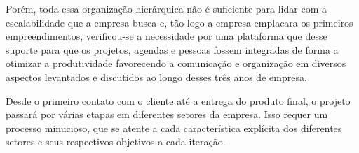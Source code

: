 Porém, toda essa organização hierárquica não é suficiente para lidar com a escalabilidade que a empresa busca e, tão logo a empresa emplacara os primeiros empreendimentos, verificou-se a necessidade por uma plataforma que desse suporte para que os projetos, agendas e pessoas fossem integradas de forma a otimizar a produtividade favorecendo a comunicação e organização em diversos aspectos levantados e discutidos ao longo desses três anos de empresa.

Desde o primeiro contato com o cliente até a entrega do produto final, o projeto passará por várias etapas em diferentes setores da empresa. Isso requer um processo minucioso, que se atente a cada característica explícita dos diferentes setores e seus respectivos objetivos a cada iteração.
